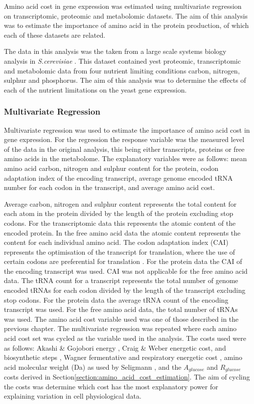 Amino acid cost in gene expression was estimated using multivariate regression on transcriptomic, proteomic and metabolomic datasets. The aim of this analysis was to estimate the importance of amino acid in the protein production, of which each of these datasets are related.

The data in this analysis was the taken from a large scale systems biology analysis in \emph{S.cerevisiae} \cite{castrillo2007}. This dataset contained yest proteomic, transcriptomic and metabolomic data from four nutrient limiting conditions carbon, nitrogen, sulphur and phosphorus. The aim of this analysis was to determine the effects of each of the nutrient limitations on the yeast gene expression.

\subsubsection{Multivariate Regression}

Multivariate regression was used to estimate the importance of amino acid cost in gene expression. For the regression the response variable was the measured level of the data in the original analysis, this being either transcripts, proteins or free amino acids in the metabolome. The explanatory variables were as follows: mean amino acid carbon, nitrogen and sulphur content for the protein, codon adaptation index of the encoding transcript, average genome encoded tRNA number for each codon in the transcript, and average amino acid cost.

Average carbon, nitrogen and sulphur content represents the total content for each atom in the protein divided by the length of the protein excluding stop codons. For the transcriptomic data this represents the atomic content of the encoded protein. In the free amino acid data the atomic content represents the content for each individual amino acid. The codon adaptation index (CAI) represents the optimisation of the transcript for translation, where the use of certain codons are preferential for translation \cite{ikemura1982}. For the protein data the CAI of the encoding transcript was used. CAI was not applicable for the free amino acid data. The tRNA count for a transcript represents the total number of genome encoded tRNAs for each codon divided by the length of the transcript excluding stop codons. For the protein data the average tRNA count of the encoding transcript was used. For the free amino acid data, the total number of tRNAs was used. The amino acid cost variable used was one of those described in the previous chapter. The multivariate regression was repeated where each amino acid cost set was cycled as the variable used in the analysis. The costs used were as follows: Akashi \& Gojobori energy \cite{akashi2002}, Craig \& Weber energetic cost, and biosynthetic steps \cite{craig1998}, Wagner fermentative and respiratory energetic cost \cite{wagner2005}, amino acid molecular weight (Da) as used by Seligmann \cite{seligmann2003}, and the $A_{glucose}$ and $R_{glucose}$ costs derived in Section\vref{section:amino_acid_cost_estimation}. The aim of cycling the costs was determine which cost has the most explanatory power for explaining variation in cell physiological data.

